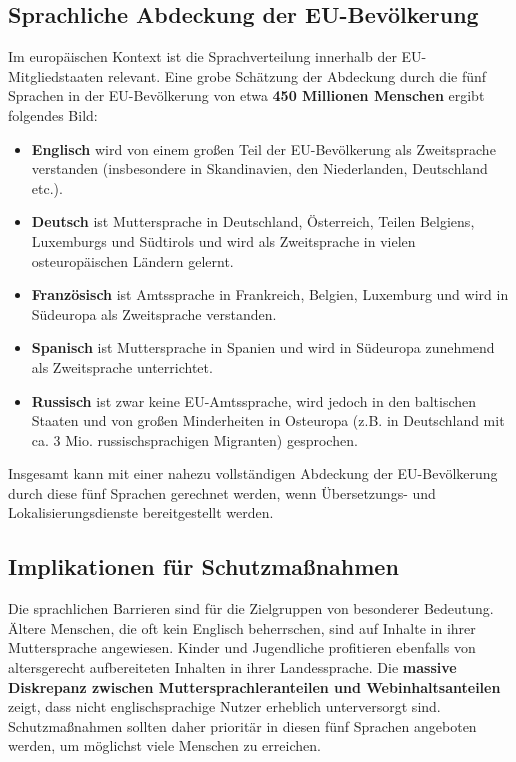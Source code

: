 \documentclass[11pt,a4paper]{article}
\begin{document}
	\subsection{Sprachliche Abdeckung der EU-Bevölkerung}
	Im europäischen Kontext ist die Sprachverteilung innerhalb der EU-Mitgliedstaaten relevant. Eine grobe Schätzung der Abdeckung durch die fünf Sprachen in der EU-Bevölkerung von etwa \textbf{450 Millionen Menschen} ergibt folgendes Bild:
	\begin{itemize}
		\item \textbf{Englisch} wird von einem großen Teil der EU-Bevölkerung als Zweitsprache verstanden (insbesondere in Skandinavien, den Niederlanden, Deutschland etc.).
		\item \textbf{Deutsch} ist Muttersprache in Deutschland, Österreich, Teilen Belgiens, Luxemburgs und Südtirols und wird als Zweitsprache in vielen osteuropäischen Ländern gelernt.
		\item \textbf{Französisch} ist Amtssprache in Frankreich, Belgien, Luxemburg und wird in Südeuropa als Zweitsprache verstanden.
		\item \textbf{Spanisch} ist Muttersprache in Spanien und wird in Südeuropa zunehmend als Zweitsprache unterrichtet.
		\item \textbf{Russisch} ist zwar keine EU-Amtssprache, wird jedoch in den baltischen Staaten und von großen Minderheiten in Osteuropa (z.B. in Deutschland mit ca. 3 Mio. russischsprachigen Migranten) gesprochen.
	\end{itemize}
	Insgesamt kann mit einer nahezu vollständigen Abdeckung der EU-Bevölkerung durch diese fünf Sprachen gerechnet werden, wenn Übersetzungs- und Lokalisierungsdienste bereitgestellt werden.
	
	\subsection{Implikationen für Schutzmaßnahmen}
	Die sprachlichen Barrieren sind für die Zielgruppen von besonderer Bedeutung. Ältere Menschen, die oft kein Englisch beherrschen, sind auf Inhalte in ihrer Muttersprache angewiesen. Kinder und Jugendliche profitieren ebenfalls von altersgerecht aufbereiteten Inhalten in ihrer Landessprache. Die \textbf{massive Diskrepanz zwischen Muttersprachleranteilen und Webinhaltsanteilen} \cite{visual2025} zeigt, dass nicht englischsprachige Nutzer erheblich unterversorgt sind. Schutzmaßnahmen sollten daher prioritär in diesen fünf Sprachen angeboten werden, um möglichst viele Menschen zu erreichen.
	
\end{document}
